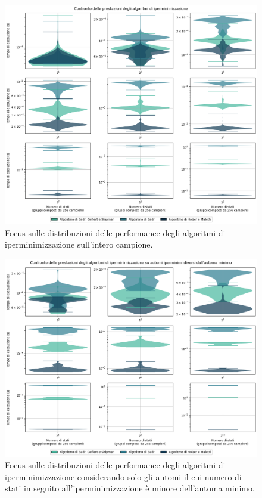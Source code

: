 \documentclass[a4paper,12pt,twoside, openright]{report} %
\begin{document}
\begin{figure}[!htb]
  \centering
  \includegraphics[width=1\linewidth]{images/performance_violin_focus_all.png}
  \caption{\label{fig:dfa-pcomparison-violin-focus-all}Focus sulle distribuzioni delle performance degli algoritmi
  di iperminimizzazione sull'intero campione.}
\end{figure}

\begin{figure}[!htb]
  \centering
  \includegraphics[width=1\linewidth]{images/performance_violin_focus_only.png}
  \caption{\label{fig:dfa-pcomparison-violin-focus-only}Focus sulle distribuzioni delle performance degli algoritmi
  di iperminimizzazione considerando solo gli automi il cui numero di stati in seguito all'iperminimizzazione
  è minore dell'automa minimo.}
\end{figure}



\printbibheading
\printbibliography[filter=papers,heading=subbibliography,title={Pubblicazioni}]
\printbibliography[type=book,heading=subbibliography,title={Testi}]
\printbibliography[type=software,heading=subbibliography,title={Software}]
\end{document}
